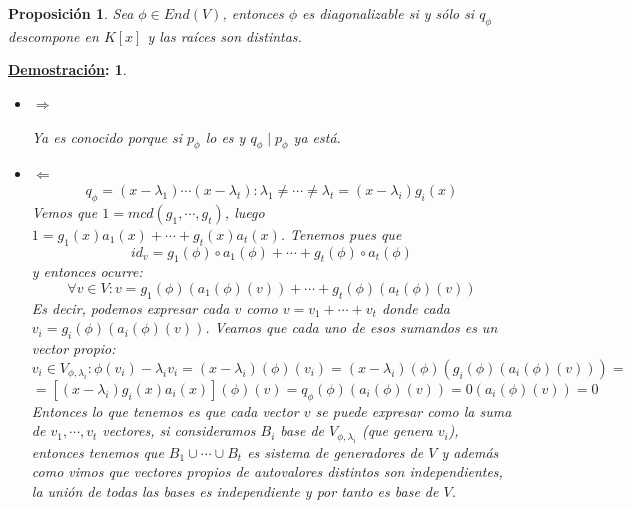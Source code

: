 \documentclass[10pt,a4paper,openright]{book}
\theoremstyle{break}
\newtheorem*{prop}{Proposición}
\newtheorem*{demo}{\underline{Demostración}:}
\begin{document}
\begin{prop}
Sea $\phi\in End(V)$, entonces $\phi$ es diagonalizable si y sólo si $q_\phi$ descompone en $K[x]$ y las raíces son distintas.
\end{prop}
\begin{demo}
\begin{itemize}
\item $\Rightarrow$

Ya es conocido porque si $p_\phi$ lo es y $q_\phi\mid p_\phi$ ya está.

\item $\Leftarrow$
$$q_\phi=(x-\lambda_1)\cdots (x-\lambda_t): \lambda_1 \neq \cdots \neq \lambda_t= (x-\lambda_i)g_i(x)$$
Vemos que $1=mcd(g_1, \cdots, g_t)$, luego $1=g_1(x)a_1(x)+\cdots +g_t(x)a_t(x)$. Tenemos pues que
$$id_v=g_1(\phi)\circ a_1(\phi)+\cdots + g_t(\phi)\circ a_t(\phi)$$
y entonces ocurre:
$$\forall v\in V: v=g_1(\phi)(a_1(\phi)(v))+\cdots + g_t(\phi)(a_t(\phi)(v))$$
Es decir, podemos expresar cada $v$ como $v=v_1+\cdots+v_t$ donde cada $v_i=g_i(\phi)(a_i(\phi)(v))$. Veamos que cada uno de esos sumandos es un vector propio:
$$v_i\in V_{\phi, \lambda_i}: \phi(v_i)-\lambda_iv_i= (x-\lambda_i)(\phi)(v_i)= (x-\lambda_i)(\phi)(g_i(\phi)(a_i(\phi)(v)))=$$
$$=[(x-\lambda_i)g_i(x)a_i(x)](\phi)(v)= q_\phi(\phi)(a_i(\phi)(v))=0(a_i(\phi)(v))=0$$
Entonces lo que tenemos es que cada vector $v$ se puede expresar como la suma de $v_1, \cdots, v_t$ vectores, si consideramos $B_i$ base de $V_{\phi, \lambda_i}$ (que genera $v_i$), entonces tenemos que $B_1\cup \cdots \cup B_t$ es sistema de generadores de $V$ y además como vimos que vectores propios de autovalores distintos son independientes, la unión de todas las bases es independiente y por tanto es base de $V$.
\end{itemize}
\end{demo}
\end{document}
